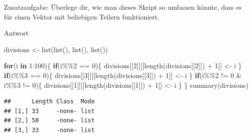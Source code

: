 \documentclass[
]{book}
\newenvironment{Shaded}{\begin{snugshade}}{\end{snugshade}}
\newcommand{\ControlFlowTok}[1]{\textcolor[rgb]{0.13,0.29,0.53}{\textbf{#1}}}
\newcommand{\DecValTok}[1]{\textcolor[rgb]{0.00,0.00,0.81}{#1}}
\newcommand{\FunctionTok}[1]{\textcolor[rgb]{0.00,0.00,0.00}{#1}}
\newcommand{\NormalTok}[1]{#1}
\newcommand{\OtherTok}[1]{\textcolor[rgb]{0.56,0.35,0.01}{#1}}
\newcommand{\SpecialCharTok}[1]{\textcolor[rgb]{0.00,0.00,0.00}{#1}}
\begin{document}
Zusatzaufgabe:
Überlege dir, wie man dieses Skript so umbauen könnte, dass es für einen Vektor mit beliebigen Teilern funktioniert.

Antwort

\begin{Shaded}
\begin{Highlighting}[]
\NormalTok{divisions }\OtherTok{\textless{}{-}} \FunctionTok{list}\NormalTok{(}\FunctionTok{list}\NormalTok{(), }\FunctionTok{list}\NormalTok{(), }\FunctionTok{list}\NormalTok{())}

\ControlFlowTok{for}\NormalTok{(i }\ControlFlowTok{in} \DecValTok{1}\SpecialCharTok{:}\DecValTok{100}\NormalTok{)\{}
  \ControlFlowTok{if}\NormalTok{(i}\SpecialCharTok{\%\%}\DecValTok{2} \SpecialCharTok{==} \DecValTok{0}\NormalTok{)\{}
\NormalTok{    divisions[[}\DecValTok{2}\NormalTok{]][[}\FunctionTok{length}\NormalTok{(divisions[[}\DecValTok{2}\NormalTok{]]) }\SpecialCharTok{+} \DecValTok{1}\NormalTok{]] }\OtherTok{\textless{}{-}}\NormalTok{ i}
\NormalTok{  \}}
  \ControlFlowTok{if}\NormalTok{(i}\SpecialCharTok{\%\%}\DecValTok{3} \SpecialCharTok{==} \DecValTok{0}\NormalTok{)\{}
\NormalTok{    divisions[[}\DecValTok{3}\NormalTok{]][[}\FunctionTok{length}\NormalTok{(divisions[[}\DecValTok{3}\NormalTok{]]) }\SpecialCharTok{+} \DecValTok{1}\NormalTok{]] }\OtherTok{\textless{}{-}}\NormalTok{ i}
\NormalTok{  \}}
  \ControlFlowTok{if}\NormalTok{(i}\SpecialCharTok{\%\%}\DecValTok{2} \SpecialCharTok{!=} \DecValTok{0} \SpecialCharTok{\&}\NormalTok{ i}\SpecialCharTok{\%\%}\DecValTok{3} \SpecialCharTok{!=} \DecValTok{0}\NormalTok{)\{}
\NormalTok{    divisions[[}\DecValTok{1}\NormalTok{]][[}\FunctionTok{length}\NormalTok{(divisions[[}\DecValTok{1}\NormalTok{]]) }\SpecialCharTok{+} \DecValTok{1}\NormalTok{]] }\OtherTok{\textless{}{-}}\NormalTok{ i}
\NormalTok{  \}}
\NormalTok{\}}
\FunctionTok{summary}\NormalTok{(divisions)}
\end{Highlighting}
\end{Shaded}

\begin{verbatim}
##      Length Class  Mode
## [1,] 33     -none- list
## [2,] 50     -none- list
## [3,] 33     -none- list
\end{verbatim}
\end{document}
